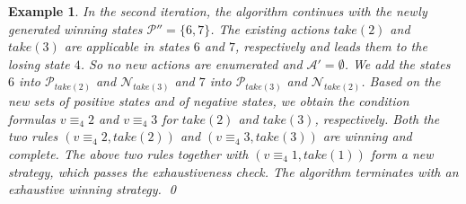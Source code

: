 \documentclass[review]{elsarticle}
\newcommand{\set}[1]{\{ #1 \}}
\newcommand{\positiveSet}{\mathcal{P}}
\newcommand{\negativeSet}{\mathcal{N}}
\newcommand{\act}{\mathcal{A}}
\newcommand{\modulo}{\equiv}
\newtheorem{example}{Example}
\begin{document}
\begin{example}
	

    In the second iteration, the algorithm continues with the newly generated winning states $\positiveSet'' = \set{6, 7}$.
    The existing actions $take(2)$ and $take(3)$ are applicable in states $6$ and $7$, respectively and leads them to the losing state $4$. %
    So no new actions are enumerated and $\act' = \emptyset$.
    We add the states $6$ into $\positiveSet_{take(2)}$ and $\negativeSet_{take(3)}$ and $7$ into $\positiveSet_{take(3)}$ and $\negativeSet_{take(2)}$.
    Based on the new sets of positive states and of negative states, we obtain the condition formulas $v \modulo_4 2$ and $v \modulo_4 3$ for $take(2)$ and $take(3)$, respectively.
    Both the two rules $(v \modulo_4 2, take(2))$ and $(v \modulo_4 3, take(3))$ are winning and complete.
    The above two rules together with $(v \modulo_4 1, take(1))$ form a new strategy, which passes the exhaustiveness check. 
    The algorithm terminates with an exhaustive winning strategy. \qed
\end{example}	
\end{document}
